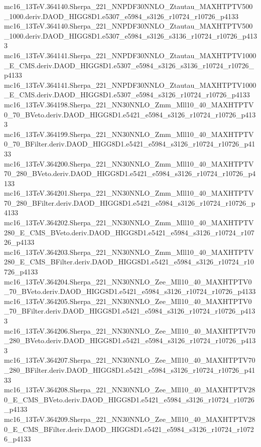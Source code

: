 mc16_13TeV.364140.Sherpa_221_NNPDF30NNLO_Ztautau_MAXHTPTV500_1000.deriv.DAOD_HIGG8D1.e5307_e5984_s3126_r10724_r10726_p4133 \\
mc16_13TeV.364140.Sherpa_221_NNPDF30NNLO_Ztautau_MAXHTPTV500_1000.deriv.DAOD_HIGG8D1.e5307_e5984_s3126_s3136_r10724_r10726_p4133 \\
mc16_13TeV.364141.Sherpa_221_NNPDF30NNLO_Ztautau_MAXHTPTV1000_E_CMS.deriv.DAOD_HIGG8D1.e5307_e5984_s3126_s3136_r10724_r10726_p4133 \\
mc16_13TeV.364141.Sherpa_221_NNPDF30NNLO_Ztautau_MAXHTPTV1000_E_CMS.deriv.DAOD_HIGG8D1.e5307_e5984_s3126_r10724_r10726_p4133 \\
mc16_13TeV.364198.Sherpa_221_NN30NNLO_Zmm_Mll10_40_MAXHTPTV0_70_BVeto.deriv.DAOD_HIGG8D1.e5421_e5984_s3126_r10724_r10726_p4133 \\
mc16_13TeV.364199.Sherpa_221_NN30NNLO_Zmm_Mll10_40_MAXHTPTV0_70_BFilter.deriv.DAOD_HIGG8D1.e5421_e5984_s3126_r10724_r10726_p4133 \\
mc16_13TeV.364200.Sherpa_221_NN30NNLO_Zmm_Mll10_40_MAXHTPTV70_280_BVeto.deriv.DAOD_HIGG8D1.e5421_e5984_s3126_r10724_r10726_p4133 \\
mc16_13TeV.364201.Sherpa_221_NN30NNLO_Zmm_Mll10_40_MAXHTPTV70_280_BFilter.deriv.DAOD_HIGG8D1.e5421_e5984_s3126_r10724_r10726_p4133 \\
mc16_13TeV.364202.Sherpa_221_NN30NNLO_Zmm_Mll10_40_MAXHTPTV280_E_CMS_BVeto.deriv.DAOD_HIGG8D1.e5421_e5984_s3126_r10724_r10726_p4133 \\
mc16_13TeV.364203.Sherpa_221_NN30NNLO_Zmm_Mll10_40_MAXHTPTV280_E_CMS_BFilter.deriv.DAOD_HIGG8D1.e5421_e5984_s3126_r10724_r10726_p4133 \\
mc16_13TeV.364204.Sherpa_221_NN30NNLO_Zee_Mll10_40_MAXHTPTV0_70_BVeto.deriv.DAOD_HIGG8D1.e5421_e5984_s3126_r10724_r10726_p4133 \\
mc16_13TeV.364205.Sherpa_221_NN30NNLO_Zee_Mll10_40_MAXHTPTV0_70_BFilter.deriv.DAOD_HIGG8D1.e5421_e5984_s3126_r10724_r10726_p4133 \\
mc16_13TeV.364206.Sherpa_221_NN30NNLO_Zee_Mll10_40_MAXHTPTV70_280_BVeto.deriv.DAOD_HIGG8D1.e5421_e5984_s3126_r10724_r10726_p4133 \\
mc16_13TeV.364207.Sherpa_221_NN30NNLO_Zee_Mll10_40_MAXHTPTV70_280_BFilter.deriv.DAOD_HIGG8D1.e5421_e5984_s3126_r10724_r10726_p4133 \\
mc16_13TeV.364208.Sherpa_221_NN30NNLO_Zee_Mll10_40_MAXHTPTV280_E_CMS_BVeto.deriv.DAOD_HIGG8D1.e5421_e5984_s3126_r10724_r10726_p4133 \\
mc16_13TeV.364209.Sherpa_221_NN30NNLO_Zee_Mll10_40_MAXHTPTV280_E_CMS_BFilter.deriv.DAOD_HIGG8D1.e5421_e5984_s3126_r10724_r10726_p4133 \\
